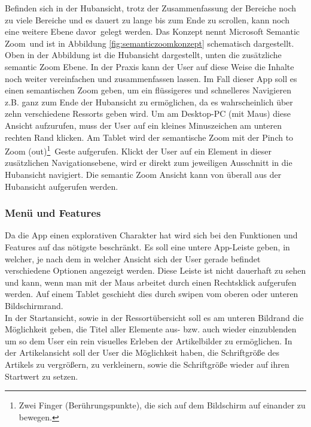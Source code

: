 \documentclass[12pt,a4paper,bibtotoc,abstracton]{scrartcl}
\begin{document}
Befinden sich in der Hubansicht, trotz der Zusammenfassung der Bereiche noch zu viele Bereiche und es dauert zu lange bis zum Ende zu scrollen, kann noch eine weitere Ebene \glqq davor\grqq\ gelegt werden. Das Konzept nennt Microsoft \glqq Semantic Zoom\grqq\ und ist in Abbildung \ref{fig:semanticzoomkonzept} schematisch dargestellt. Oben in der Abbildung ist die Hubansicht dargestellt, unten die zusätzliche semantic Zoom Ebene. In der Praxis kann der User auf diese Weise die Inhalte noch weiter vereinfachen und zusammenfassen lassen. Im Fall dieser App soll es einen semantischen Zoom geben, um ein flüssigeres und schnelleres Navigieren z.B. ganz zum Ende der Hubansicht zu ermöglichen, da es wahrscheinlich über zehn verschiedene Ressorts geben wird. Um am Desktop-PC (mit Maus) diese Ansicht aufzurufen, muss der User auf ein kleines Minuszeichen am unteren rechten Rand klicken. Am Tablet wird der semantische Zoom mit der \glqq Pinch to Zoom (out)\footnote{Zwei Finger (Berührungspunkte), die sich auf dem Bildschirm auf einander zu bewegen.}\grqq\  Geste aufgerufen. Klickt der User auf ein Element in dieser zusätzlichen Navigationsebene, wird er direkt zum jeweiligen Ausschnitt in die Hubansicht navigiert. Die semantic Zoom Ansicht kann von überall aus der Hubansicht aufgerufen werden.  

\subsubsection{Menü und Features}
\label{subsubsec:menuandproperties}
Da die App einen explorativen Charakter hat wird sich bei den Funktionen und Features auf das nötigste beschränkt. Es soll eine untere App-Leiste geben, in welcher, je nach dem in welcher Ansicht sich der User gerade befindet verschiedene Optionen angezeigt werden. Diese Leiste ist nicht dauerhaft zu sehen und kann, wenn man mit der Maus arbeitet durch einen Rechtsklick aufgerufen werden. Auf einem Tablet geschieht dies durch swipen vom oberen oder unteren Bildschirmrand.\\
In der Startansicht, sowie in der Ressortübersicht soll es am unteren Bildrand die Möglichkeit geben, die Titel aller Elemente aus- bzw. auch wieder einzublenden um so dem User ein rein visuelles Erleben der Artikelbilder zu ermöglichen. In der Artikelansicht soll der User die Möglichkeit haben, die Schriftgröße des Artikels zu vergrößern, zu verkleinern, sowie die Schriftgröße wieder auf ihren Startwert zu setzen. 
\end{document}

